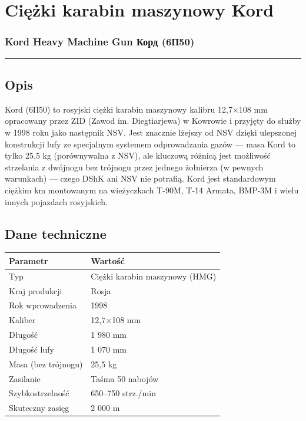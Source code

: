 \documentclass[12pt,openany,oneside]{book}
\begin{document}
\chapter{Ciężki karabin maszynowy
Kord}\label{ciux119ux17cki-karabin-maszynowy-kord}

\subsection{Kord Heavy Machine Gun \textbar{} Корд
(6П50)}\label{kord-heavy-machine-gun-ux43aux43eux440ux434-6ux43f50}

\begin{center}\rule{0.5\linewidth}{0.5pt}\end{center}

\section{Opis}\label{opis-60}

Kord (6П50) to rosyjski ciężki karabin maszynowy kalibru 12,7×108 mm
opracowany przez ZID (Zawod im. Diegtiarjewa) w Kowrowie i przyjęty do
służby w 1998 roku jako następnik NSV. Jest znacznie lżejszy od NSV
dzięki ulepszonej konstrukcji lufy ze specjalnym systemem odprowadzania
gazów --- masa Kord to tylko 25,5 kg (porównywalna z NSV), ale kluczową
różnicą jest możliwość strzelania z dwójnogu bez trójnogu przez jednego
żołnierza (w pewnych warunkach) --- czego DShK ani NSV nie potrafią.
Kord jest standardowym ciężkim km montowanym na wieżyczkach T-90M, T-14
Armata, BMP-3M i wielu innych pojazdach rosyjskich.

\section{Dane techniczne}\label{dane-techniczne-60}

\begin{longtable}[]{@{}ll@{}}
\toprule\noalign{}
Parametr & Wartość \\
\midrule\noalign{}
\endhead
\bottomrule\noalign{}
\endlastfoot
Typ & Ciężki karabin maszynowy (HMG) \\
Kraj produkcji & Rosja \\
Rok wprowadzenia & 1998 \\
Kaliber & 12,7×108 mm \\
Długość & 1 980 mm \\
Długość lufy & 1 070 mm \\
Masa (bez trójnogu) & 25,5 kg \\
Zasilanie & Taśma 50 nabojów \\
Szybkostrzelność & 650--750 strz./min \\
Skuteczny zasięg & 2 000 m \\
\end{longtable}
\end{document}
